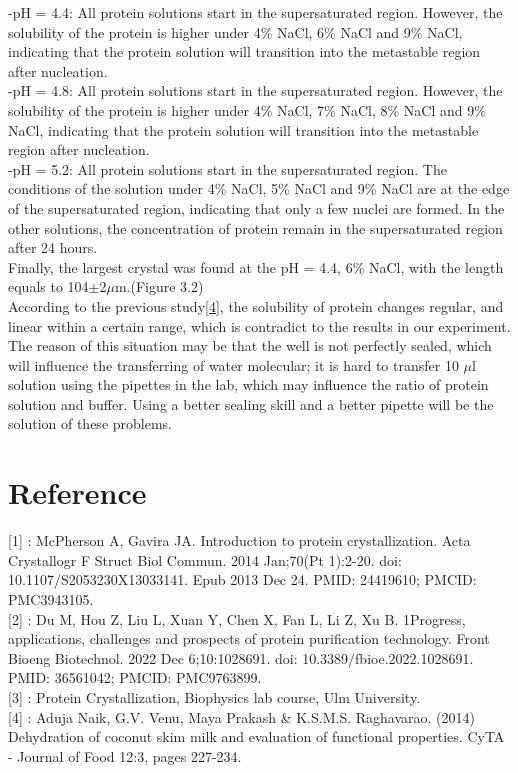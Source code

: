 \documentclass[a4paper,english,12pt,bibliography=totoc]{scrreprt}
\begin{document}
-pH = 4.4: All protein solutions start in the supersaturated region. However, the solubility of the protein is higher under 4\% NaCl, 6\% NaCl and 9\% NaCl, indicating that the protein solution will transition into the metastable region after nucleation.\\

-pH = 4.8: All protein solutions start in the supersaturated region. However, the solubility of the protein is higher under 4\% NaCl, 7\% NaCl, 8\% NaCl and 9\% NaCl, indicating that the protein solution will transition into the metastable region after nucleation.\\


-pH = 5.2: All protein solutions start in the supersaturated region. The conditions of the solution under 4\% NaCl, 5\% NaCl and 9\% NaCl are at the edge of the supersaturated region, indicating that only a few nuclei are formed. In the other solutions, the concentration of protein remain in the supersaturated region after 24 hours.\\

Finally, the largest crystal was found at the pH = 4.4, 6\% NaCl, with the length equals to 104$\pm $2$\mu$m.(Figure 3.2)\\

According to the previous study\hyperref[sec:ref_4]{[4]}, the solubility of protein changes regular, and linear within a certain range, which is contradict to the results in our experiment. The reason of this situation may be that the well is not perfectly sealed, which will influence the transferring of water molecular; it is hard to transfer 10 $\mu$l solution using the pipettes in the lab, which may influence the ratio of protein solution and buffer. Using a better sealing skill and a better pipette will be the solution of these problems.

\chapter{Reference}
[1]\label{sec:ref_1} : McPherson A, Gavira JA. Introduction to protein crystallization. Acta Crystallogr F Struct Biol Commun. 2014 Jan;70(Pt 1):2-20. doi: 10.1107/S2053230X13033141. Epub 2013 Dec 24. PMID: 24419610; PMCID: PMC3943105. \\

[2]\label{sec:ref_2} : Du M, Hou Z, Liu L, Xuan Y, Chen X, Fan L, Li Z, Xu B. 1Progress, applications, challenges and prospects of protein purification technology. Front Bioeng Biotechnol. 2022 Dec 6;10:1028691. doi: 10.3389/fbioe.2022.1028691. PMID: 36561042; PMCID: PMC9763899.\\

[3]\label{sec:ref_3} : Protein Crystallization, Biophysics lab course, Ulm University.\\

[4]\label{sec:ref_4} : Aduja Naik, G.V. Venu, Maya Prakash \& K.S.M.S. Raghavarao. (2014) Dehydration of coconut skim milk and evaluation of functional properties. CyTA - Journal of Food 12:3, pages 227-234.\\

\end{document}
